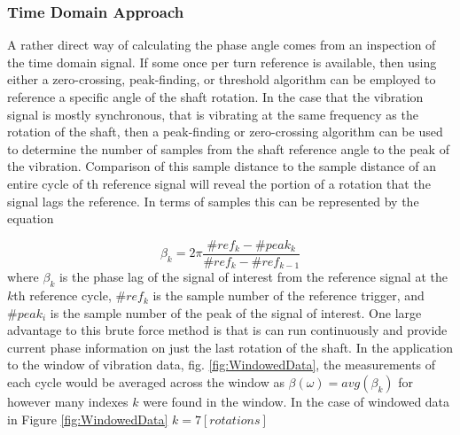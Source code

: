 \subsubsection{Time Domain Approach}
A rather direct way of calculating the phase angle comes from an inspection of the time domain signal. If some once per turn reference is available, then using either a zero-crossing, peak-finding, or threshold algorithm can be employed to reference a specific angle of the shaft rotation. In the case that the vibration signal is mostly synchronous, that is vibrating at the same frequency as the rotation of the shaft, then a peak-finding or zero-crossing algorithm can be used to determine the number of samples from the shaft reference angle to the peak of the vibration. Comparison of this sample distance to the sample distance of an entire cycle of th reference signal will reveal the portion of a rotation that the signal lags the reference. In terms of samples this can be represented by the equation\par 
\begin{equation}\label{eq:PhaseAngleTimeDomain}
\beta_k = 2\pi\frac{\#ref_k-\#peak_k}{\#ref_k-\#ref_{k-1}}
\end{equation}
where $ \beta_k $ is the phase lag of the signal of interest from the reference signal at the $ k $th reference cycle, $ \#ref_k $ is the sample number of the reference trigger, and $ \#peak_i $ is the sample number of the peak of the signal of interest. One large advantage to this brute force method is that is can run continuously and provide current phase information on just the last rotation of the shaft. In the application to the window of vibration data, fig. \ref{fig:WindowedData}, the measurements of each cycle would be averaged across the window as $ \beta(\omega)=avg(\beta_k) $ for however many indexes $ k $ were found in the window. In the case of windowed data in Figure \ref{fig:WindowedData} $ k=7[rotations] $\par 
